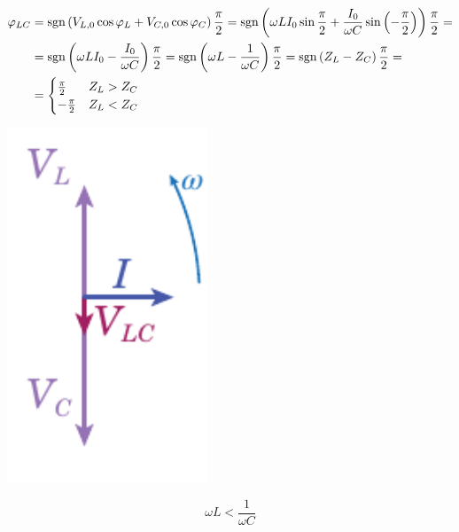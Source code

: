 \begin{align*}
	\oldphi_{LC}&=\mathrm{sgn}\left(V_{L,0}\cos\oldphi_L+V_{C,0}\cos\oldphi_C\right)\frac{\pi}{2}=\mathrm{sgn}\left(\omega L I_0\sin\frac{\pi}{2}+\frac{I_0}{\omega C}\sin\left(-\frac{\pi}{2}\right)\right)\frac{\pi}{2}=\\
	&=\mathrm{sgn}\left(\omega L I_0-\frac{I_0}{\omega C}\right)\frac{\pi}{2}=\mathrm{sgn}\left(\omega L -\frac{1}{\omega C}\right)\frac{\pi}{2}=\mathrm{sgn}\left(Z_L - Z_C\right)\frac{\pi}{2}=\\
	&=\begin{cases}
		\frac{\pi}{2}&Z_L>Z_C\\
		-\frac{\pi}{2}&Z_L<Z_C\\
	\end{cases}
\end{align*}
\begin{minipage}{0.49\textwidth}
	\begin{center}
		\includegraphics[width=0.45\textwidth]{images/chp11/chp11fasoriLC2.pdf}
	\end{center}
$$\omega L<\frac{1}{\omega C}$$
\end{minipage}
